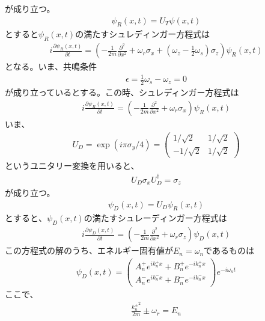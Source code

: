 が成り立つ。
\begin{align}
{\psi}_{R}(x,t)=U_{T}{\psi}(x,t)
\end{align}
$とすると{\psi}_{R}(x,t)の満たすシュレディンガー方程式は$
\begin{align}
i\frac{\partial {\psi}_{R}(x,t)}{\partial t}=\left(-\frac{1}{2m}\frac{\partial^2}{\partial x^2}+\omega_{r}{\sigma}_{x}+\left(\omega_{z}-\frac{1}{2}\omega_{s}\right){\sigma}_{z}\right){\psi}_{R}(x,t)
\end{align}
となる。いま、共鳴条件
\begin{align}
{\epsilon}=\frac{1}{2}\omega_{s}-\omega_{z}=0
\end{align}
が成り立っているとする。この時、シュレディンガー方程式は
\begin{align}
i\frac{\partial {\psi}_{R}(x,t)}{\partial t}=\left(-\frac{1}{2m}\frac{\partial^2}{\partial x^2}+\omega_{r}{\sigma}_{x}\right){\psi}_{R}(x,t)
\end{align}
いま、
\begin{align}
U_{D}=\exp(i{\pi}{\sigma}_{y}/4)=
\begin{pmatrix}
1/\sqrt{2} &1/\sqrt{2} \\
-1/\sqrt{2} &1/\sqrt{2}
\end{pmatrix}
\end{align}
というユニタリー変換を用いると、
\begin{align}
U_{D}{\sigma}_{x}U_{D}^{\dagger}={\sigma}_{z}
\end{align}
が成り立つ。
\begin{align}
{\psi}_{D}(x,t)=U_{D}{\psi}_{R}(x,t)
\end{align}
$とすると、{\psi}_{D}(x,t)の満たすシュレーディンガー方程式は$
\begin{align}
i\frac{\partial {\psi}_{D}(x,t)}{\partial t}=\left(-\frac{1}{2m}\frac{\partial^2}{\partial x^2}+\omega_{r}{\sigma}_{z}\right){\psi}_{D}(x,t)
\end{align}
$この方程式の解のうち、エネルギー固有値がE_{n}=\omega_{n}であるものは$
\begin{align}
{\psi}_{D}(x,t) =
\begin{pmatrix}
A_{n}^{+}e^{ik_{n}^{+}x}+B_{n}^{+}e^{-ik_{n}^{+}x}  \\
A_{n}^{-}e^{ik_{n}^{-}x}+B_{n}^{-}e^{-ik_{n}^{-}x}
\end{pmatrix}
e^{-i\omega_{n}t}
\end{align}
ここで、
\begin{align}
\frac{{k_{n}^{\pm}}^2}{2m}{\pm}\omega_{r}=E_{n}
\end{align}
